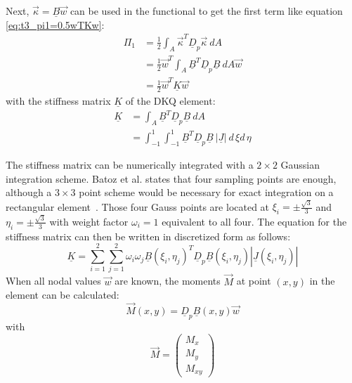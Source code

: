   Next, $\vec{\kappa} = \underline{B} \vec{w}$ can be used in the functional to get the first term like equation \eqref{eq:t3_pi1=0.5wTKw}:
  \begin{align}
  \Pi_1 &= \frac{1}{2} \int_A \vec{\kappa}^T \underline{D}_p \vec{\kappa}\ d\!A \nonumber\\
  &= \frac{1}{2} \vec{w}^T \int_A \underline{B}^T \underline{D}_p \underline{B}\ d\!A \vec{w}\nonumber\\
  &= \frac{1}{2} \vec{w}^T \underline{K} \vec{w} \nonumber
  \end{align}
  with the stiffness matrix $\underline{K}$ of the DKQ element:
  \begin{align}
  \underline{K} &= \int_A \underline{B}^T \underline{D}_p \underline{B}\ d\!A \nonumber\\
  &= \int_{-1}^{1} \int_{-1}^{1} \underline{B}^T \underline{D}_p \underline{B}\ \left|\underline{J}\right|\ d\,\!\xi d\,\!\eta
  \end{align}
  
  The stiffness matrix can be numerically integrated with a $2\!\times\!2$ Gaussian integration scheme. Batoz et al. states that four sampling points are enough, although a $3\!\times\!3$ point scheme would be necessary for exact integration on a rectangular element~\cite{batoz1982evaluation}. Those four Gauss points are located at $\xi_i = \pm \frac{\sqrt{3}}{3}$ and $\eta_i = \pm \frac{\sqrt{3}}{3}$ with weight factor $\omega_i = 1$ equivalent to all four. The equation for the stiffness matrix can then be written in discretized form as follows:
  \begin{equation}
  \underline{K} = \sum_{i=1}^{2} \sum_{j=1}^{2} \omega_i \omega_j \underline{B}(\xi_i,\eta_j)^T \underline{D}_p \underline{B}(\xi_i,\eta_j) \left|\underline{J}(\xi_i,\eta_j)\right|
  \end{equation}
  When all nodal values $\vec{w}$ are known, the moments $\vec{M}$ at point $(x,y)$ in the element can be calculated:
  \begin{equation}
  \vec{M}(x,y) = \underline{D}_p \underline{B}(x,y) \vec{w}
  \end{equation}
  with
  \begin{equation}
  \vec{M} = \begin{pmatrix}
  M_x\\M_y\\M_{xy}
  \end{pmatrix}
  \end{equation}
 
